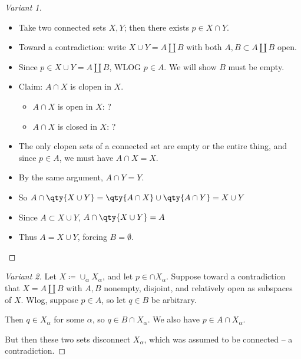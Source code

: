 \begin{solution}

\envlist

\begin{concept}

\envlist

\end{concept}

\begin{proof}[Variant 1]

\begin{itemize}
\tightlist
\item
  Take two connected sets \(X, Y\); then there exists \(p\in X\cap Y\).
\item
  Toward a contradiction: write \(X\cup Y = A {\coprod}B\) with both
  \(A, B \subset A{\coprod}B\) open.
\item
  Since \(p\in X \cup Y = A{\coprod}B\), WLOG \(p\in A\). We will show
  \(B\) must be empty.
\item
  Claim: \(A\cap X\) is clopen in \(X\).

  \begin{itemize}
  \tightlist
  \item
    \(A\cap X\) is open in \(X\): ?
  \item
    \(A\cap X\) is closed in \(X\): ?
  \end{itemize}
\item
  The only clopen sets of a connected set are empty or the entire thing,
  and since \(p\in A\), we must have \(A\cap X = X\).
\item
  By the same argument, \(A\cap Y = Y\).
\item
  So \(A\cap\qty{X\cup Y} = \qty{A\cap X} \cup\qty{A\cap Y} = X\cup Y\)
\item
  Since \(A\subset X\cup Y\), \(A\cap\qty{X\cup Y} = A\)
\item
  Thus \(A = X\cup Y\), forcing \(B = \emptyset\).
\end{itemize}

\end{proof}

\begin{proof}[Variant 2]

Let \(X \coloneqq\cup_\alpha X_\alpha\), and let \(p\in \cap X_\alpha\).
Suppose toward a contradiction that \(X = A {\coprod}B\) with \(A,B\)
nonempty, disjoint, and relatively open as subspaces of \(X\). Wlog,
suppose \(p\in A\), so let \(q\in B\) be arbitrary.

Then \(q\in X_\alpha\) for some \(\alpha\), so \(q\in B \cap X_\alpha\).
We also have \(p\in A \cap X_\alpha\).

But then these two sets disconnect \(X_\alpha\), which was assumed to be
connected -- a contradiction.

\end{proof}

\end{solution}

